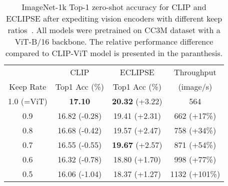 \begin{table}[t!]
  \centering
  \small
  \begin{tabular}{c c c c}
    \toprule
              & CLIP                        & ECLIPSE                    & Throughput \\
    Keep Rate & Top1 Acc (\%)               & Top1 Acc (\%)              & (image/s) \\ \midrule
    1.0 (=ViT)       & \textbf{17.10}              & \textbf{20.32} (+3.22) & 564 \\ \hline
    0.9       & 16.82 (-0.28) & 19.41 (+2.31) & 662 (+17\%) \\
    0.8       & 16.68 (-0.42) & 19.57 (+2.47) & 758 (+34\%) \\
    0.7       & 16.55 (-0.55) & \textbf{19.67} (+2.57) & 871 (+54\%) \\
    0.6       & 16.32 (-0.78) & 18.80 (+1.70) & 998 (+77\%) \\
    0.5       & 16.06 (-1.04)  & 18.37 (+1.27) & 1132 (+101\%) \\
    \bottomrule
  \end{tabular}
  \caption{
  ImageNet-1k Top-1 zero-shot accuracy for CLIP and ECLIPSE after expediting vision encoders with different keep ratios~\cite{liang2022evit}. All models were pretrained on CC3M dataset with a ViT-B/16 backbone.
  The relative performance difference compared to CLIP-ViT model is presented in the paranthesis.
  }
  \label{tab:keep}
\end{table}